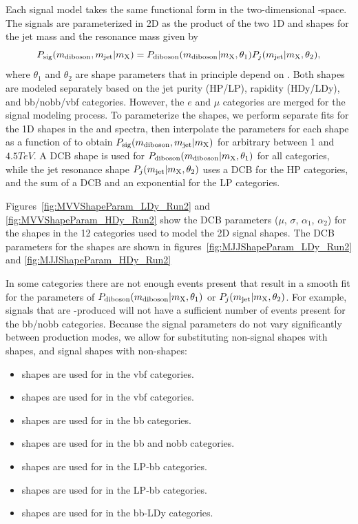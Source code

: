 Each signal model takes the same functional form in the two-dimensional \MJ-\MVV space.
The signals are parameterized in 2D as the product of the two 1D \MJ and \MVV shapes for the jet mass and the resonance mass given by
\begin{equation}
  P_\mathrm{sig}(m_\mathrm{diboson},m_\mathrm{jet}|m_\mathrm{X})=P_\mathrm{diboson}(m_\mathrm{diboson}|m_\mathrm{X},\theta_1)P_j(m_\mathrm{jet}|m_\mathrm{X},\theta_2),
\end{equation}
where $\theta_1$ and $\theta_2$ are shape parameters that in principle depend on \MX.
Both shapes are modeled separately based on the jet purity (HP/LP), rapidity (HDy/LDy), and bb/nobb/vbf categories.
However, the $e$ and $\mu$ categories are merged for the signal modeling process.
To parameterize the shapes, we perform separate fits for the 1D shapes in the \MVV and \MJ spectra, then interpolate the parameters for each shape as a function of \MX to obtain $P_\mathrm{sig}(m_\mathrm{diboson},m_\mathrm{jet}|m_\mathrm{X})$ for arbitrary \MX between 1 and $4.5\unit{TeV}$.
A DCB shape is used for $P_\mathrm{diboson}(m_\mathrm{diboson}|m_\mathrm{X},\theta_1)$ for all categories, while the jet resonance shape $P_j(m_\mathrm{jet}|m_\mathrm{X},\theta_2)$ uses a DCB for the HP categories, and the sum of a DCB and an exponential for the LP categories.

Figures~\ref{fig:MVVShapeParam_LDy_Run2} and \ref{fig:MVVShapeParam_HDy_Run2} show the DCB parameters ($\mu$, $\sigma$, $\alpha_1$, $\alpha_2$) for the \MVV shapes in the 12 categories used to model the 2D signal shapes.
The DCB parameters for the \MJ shapes are shown in figures~\ref{fig:MJJShapeParam_LDy_Run2} and \ref{fig:MJJShapeParam_HDy_Run2}

In some categories there are not enough events present that result in a smooth fit for the parameters of $P_\mathrm{diboson}(m_\mathrm{diboson}|m_\mathrm{X},\theta_1)$ or $P_j(m_\mathrm{jet}|m_\mathrm{X},\theta_2)$.
For example, signals that are \VBF-produced will not have a sufficient number of events present for the bb/nobb categories.
Because the signal parameters do not vary significantly between production modes, we allow for substituting non-\VBF signal shapes with \VBF shapes, and \VBF signal shapes with non-\VBF shapes:
\begin{itemize}
  \item \VBF\ZprtoWW shapes are used for \DY\ZprtoWW in the vbf categories.
  \item \VBF\WprtoWZ shapes are used for \DY\WprtoWZ in the vbf categories.
  \item \ggF\GBulktoWW shapes are used for \VBF\GBulktoWW in the bb categories.
  \item \DY\WprtoWZ shapes are used for \VBF\WprtoWZ in the bb and nobb categories.
  \item \ggF\RadtoWW shapes are used for \VBF\RadtoWW in the LP-bb categories.
  \item \ggF\GBulktoWW \MJ shapes are used for \DY\ZprtoWW \MJ in the LP-bb categories.
  \item \DY\ZprtoWW shapes are used for \VBF\ZprtoWW in the bb-LDy categories.
\end{itemize}

